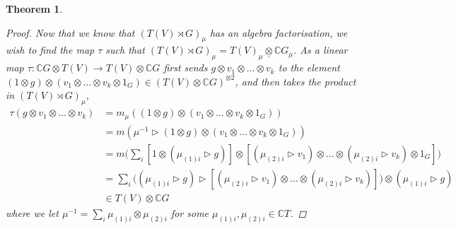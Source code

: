 \documentclass[10pt]{article}
\newcommand{\bb}{\medbreak}
\newcommand{\nt}{\noindent}
\newcommand{\Cc }{\mathbb{C}}
\newcommand{\rt}{\xrightarrow{}}
\newtheorem{theorem}[lemma]{Theorem}
\theoremstyle{definition}
\begin{document}
\begin{theorem}
\begin{proof}
\nt Now that we know that $(T(V)\rtimes G)_\mu$ has an algebra factorisation, we wish to find the map $\tau$ such that $(T(V)\rtimes G)_\mu=T(V)_\mu \underline{\otimes} \Cc  G_\mu$. As a linear map $\tau:\Cc G\otimes T(V)\rt T(V)\otimes \Cc G$ first sends $g\otimes v_1\otimes \dots \otimes v_k$ to the element $(1\otimes g)\otimes (v_1\otimes \dots \otimes v_k\otimes 1_G)\in (T(V)\otimes \Cc G)^{\otimes 2}$, and then takes the product in $(T(V)\rtimes G)_\mu$,
\begin{align}\label{tau}
\tau(g\otimes v_1\otimes \dots \otimes v_k) & = m_\mu((1\otimes g)\otimes (v_1\otimes \dots \otimes v_k\otimes 1_G))\nonumber\\
  & = m(\mu^{-1}\rhd (1\otimes g)\otimes (v_1\otimes \dots \otimes v_k\otimes 1_G))\nonumber\\
& = m\big(\sum_i [1\otimes (\mu_{(1)i}\rhd g)]\otimes [(\mu_{(2)i}\rhd v_1)\otimes \dots \otimes (\mu_{(2)i}\rhd v_k)\otimes 1_G]\big)\nonumber\\
& = \sum_i \big((\mu_{(1)i}\rhd g)\rhd [(\mu_{(2)i}\rhd v_1)\otimes \dots \otimes (\mu_{(2)i}\rhd v_k)] \big)\otimes (\mu_{(1)i}\rhd g)\\
& \in T(V)\otimes \Cc G\nonumber
\end{align}
where we let $\mu^{-1}=\sum_i \mu_{(1)i}\otimes \mu_{(2)i}$ for some $\mu_{(1)i},\mu_{(2)i}\in \Cc T$.\bb


\end{proof}
\end{theorem}
\end{document}
